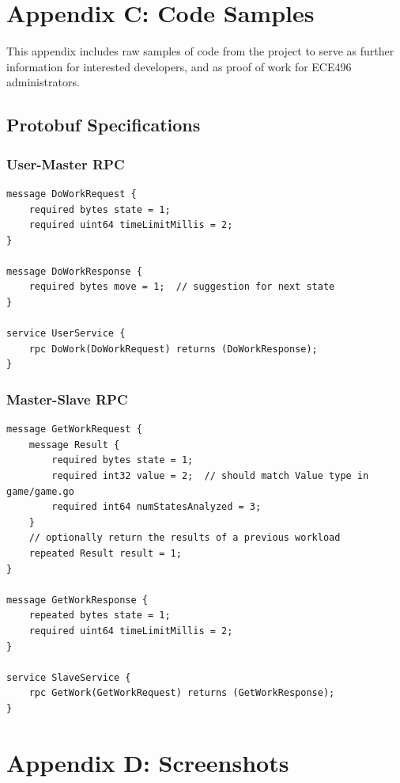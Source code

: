 \documentclass[pdftex,12pt,a4paper]{article}
\begin{document}
%
%
\pagebreak
\section{Appendix C: Code Samples}

This appendix includes raw samples of code from the project to serve as further information for interested developers, and as proof of work for ECE496 administrators.

\subsection{Protobuf Specifications}\label{sec:protobuf-sample}

\subsubsection*{User-Master RPC}
\begin{lstlisting}
message DoWorkRequest {
    required bytes state = 1;
    required uint64 timeLimitMillis = 2;
}

message DoWorkResponse {
    required bytes move = 1;  // suggestion for next state
}

service UserService {
    rpc DoWork(DoWorkRequest) returns (DoWorkResponse);
}
\end{lstlisting}

\subsubsection*{Master-Slave RPC}
\begin{lstlisting}
message GetWorkRequest {
    message Result {
        required bytes state = 1;
        required int32 value = 2;  // should match Value type in game/game.go
        required int64 numStatesAnalyzed = 3;
    }
    // optionally return the results of a previous workload
    repeated Result result = 1;
}

message GetWorkResponse {
    repeated bytes state = 1;
    required uint64 timeLimitMillis = 2;
}

service SlaveService {
    rpc GetWork(GetWorkRequest) returns (GetWorkResponse);
}
\end{lstlisting}

%
%
\pagebreak
\section{Appendix D: Screenshots}
\end{document}
